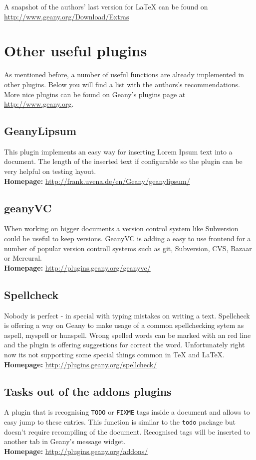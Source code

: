 \documentclass[%
paper=a4,%
fontsize=11pt,%
twoside=false,%
DIV18,%
headsepline,%
plainheadsepline,%
footsepline,%
plainfootsepline,%
bibliography=totoc,%
listof=totoc,%
BCOR10mm,%
parskip=half,%
openany,%
]{scrreprt}
\begin{document}
A snapshot of the authors' last version for LaTeX can be found on
\url{http://www.geany.org/Download/Extras}

\section{Other useful plugins}
As mentioned before, a number of useful functions are already
implemented in other plugins. Below you will find a list with the
authors's recommendations. More nice plugins can be found on Geany's
plugins page at \url{http://www.geany.org}.

\subsection{GeanyLipsum}
This plugin implements an easy way for inserting Lorem Ipsum text into
a document. The length of the inserted text if configurable so the
plugin can be very helpful on testing layout.\\
\textbf{Homepage:} \url{http://frank.uvena.de/en/Geany/geanylipsum/}

\subsection{geanyVC}
When working on bigger documents a version control system like
Subversion could be useful to keep versions. GeanyVC is adding a easy
to use frontend for a number of popular version controll systems such
as git, Subversion, CVS, Bazaar or Mercural.\\
\textbf{Homepage:} \url{http://plugins.geany.org/geanyvc/}

\subsection{Spellcheck}
Nobody is perfect - in special with typing mistakes on writing a
text. Spellcheck is offering a way on Geany to make usage of a
common spellchecking sytem as aspell, myspell or hunspell. Wrong
spelled words can be marked with an red line and the plugin is
offering suggestions for correct the word. Unfortunately right now
its not supporting some special things common in \TeX{} and \LaTeX{}.\\
\textbf{Homepage:} \url{http://plugins.geany.org/spellcheck/}

\subsection{Tasks out of the addons plugins}
A plugin that is recognising \texttt{TODO} or \texttt{FIXME} tags
inside a document and allows to easy jump to these entries. This
function is similar to the \texttt{todo} package but doesn't require
recompiling of the document. Recognised tags will be inserted to
another tab in Geany's message widget.\\
\textbf{Homepage:} \url{http://plugins.geany.org/addons/}
\end{document}
